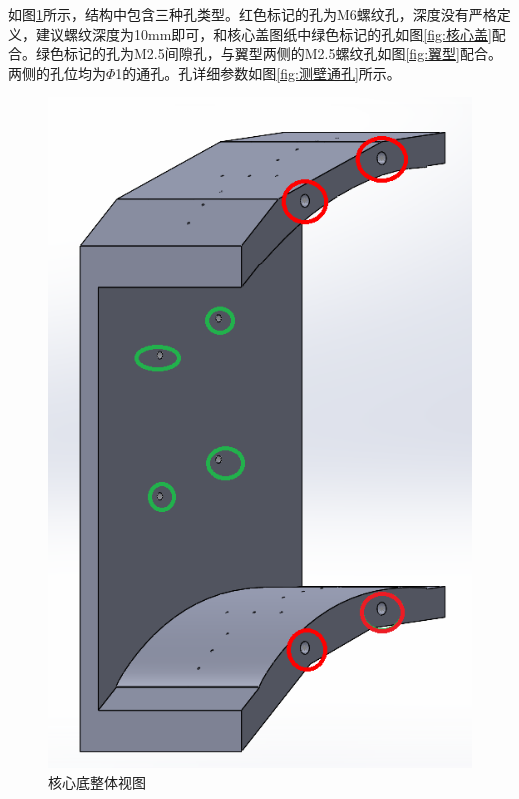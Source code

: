 \documentclass{MyLatex}
\begin{document}
如图\ref{fig:核心底整体视图}所示，结构中包含三种孔类型。红色标记的孔为M6螺纹孔，深度没有严格定义，建议螺纹深度为10mm即可，和核心盖图纸中绿色标记的孔如图\ref{fig:核心盖}配合。绿色标记的孔为M2.5间隙孔，与翼型两侧的M2.5螺纹孔如图\ref{fig:翼型}配合。两侧的孔位均为$\Phi$1的通孔。孔详细参数如图\ref{fig:测壁通孔}所示。
\begin{figure}[H]
\centering
\includegraphics[width=0.8\linewidth]{./image/Zpicture/核心底整体视图.png}
\caption{核心底整体视图} \label{fig:核心底整体视图}
\end{figure}
\end{document}
